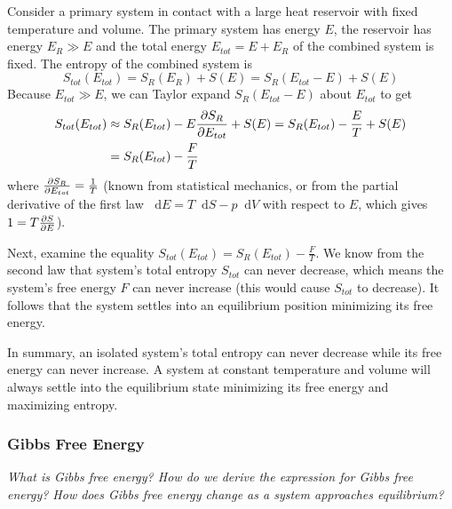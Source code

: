 \documentclass[11pt, a4paper]{article}
\newcommand{\diff}{\mathop{}\!\mathrm{d}} %
\begin{document}
\begin{itemize}
	Consider a primary system in contact with a large heat reservoir with fixed temperature and volume. The primary system has energy $ E $, the reservoir has energy $ E_{R} \gg E $ and the total energy $ E_{tot} = E + E_{R} $ of the combined system is fixed.  The entropy of the combined system is
	\begin{equation*}
		S_{tot}(E_{tot}) = S_{R}(E_{R}) + S(E) = S_{R}(E_{tot} - E) + S(E)
	\end{equation*}
	Because $ E_{tot} \gg E $, we can Taylor expand $ S_{R}(E_{tot} - E) $ about $ E_{tot} $ to get
	\begin{align*}
		S_{tot}(E_{tot}) &\approx S_{R}(E_{tot}) - E \pdv{S_{R}}{E_{tot}} + S(E) = S_{R}(E_{tot}) - \frac{E}{T} + S(E) \\
		&= S_{R}(E_{tot}) - \frac{F}{T}
	\end{align*}
	where $ \pdv{S_{R}}{E_{tot}} = \frac{1}{T} $ (known from statistical mechanics, or from the partial derivative of the first law $ \diff E = T \diff S - p \diff V $ with respect to $ E $, which gives $ 1 = T \pdv{S}{E} $).
	
	Next, examine the equality $ S_{tot}(E_{tot}) = S_{R}(E_{tot}) - \frac{F}{T} $. We know from the second law that system's total entropy $ S_{tot} $ can never decrease, which means the system's free energy $ F $ can never increase (this would cause $ S_{tot} $ to decrease). It follows that the system settles into an equilibrium position minimizing its free energy.
	
	In summary, an isolated system's total entropy can never decrease while its free energy can never increase. A system at constant temperature and volume will always settle into the equilibrium state minimizing its free energy and maximizing entropy.
	

\end{itemize}


\subsubsection{Gibbs Free Energy} \label{sss:gibbs_free_energy}
\textit{What is Gibbs free energy? How do we derive the expression for Gibbs free energy? How does Gibbs free energy change as a system approaches equilibrium?}
\end{document}
